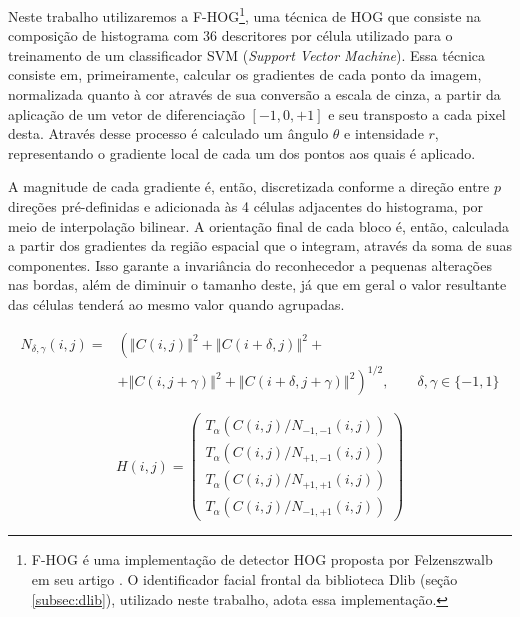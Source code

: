 Neste trabalho utilizaremos a F-HOG\footnote{F-HOG é uma implementação de detector HOG proposta por Felzenszwalb em seu artigo \cite{felzenszwalbObjectDetectionDiscriminatively}. O identificador facial frontal da biblioteca Dlib (seção \ref{subsec:dlib}), utilizado neste trabalho, adota essa implementação.}, uma técnica de HOG que consiste na composição de histograma com 36 descritores por célula utilizado para o treinamento de um classificador SVM (\textit{Support Vector Machine}).
Essa técnica consiste em, primeiramente, calcular os gradientes de cada ponto da imagem, normalizada quanto à cor através de sua conversão a escala de cinza, a partir da aplicação de um vetor de diferenciação $[-1, 0, +1]$ e seu transposto a cada pixel desta.
Através desse processo é calculado um ângulo $\theta$ e intensidade $r$, representando o gradiente local de cada um dos pontos aos quais é aplicado.

A magnitude de cada gradiente é, então, discretizada conforme a direção entre $p$ direções pré-definidas e adicionada às 4 células adjacentes do histograma, por meio de interpolação bilinear.
A orientação final de cada bloco é, então, calculada a partir dos gradientes da região espacial que o integram, através da soma de suas componentes.
Isso garante a invariância do reconhecedor a pequenas alterações nas bordas, além de diminuir o tamanho deste, já que em geral o valor resultante das células tenderá ao mesmo valor quando agrupadas.

\begin{equation}\label{eq:hog_energy}
    \begin{split}
        N_{\delta,\gamma}(i,j) = & \left(
            \left\Vert C(i,j) \right\Vert ^2 +
            \left\Vert C(i+\delta,j) \right\Vert ^2 +
            \right.\\ 
            & + \left. \left\Vert C(i,j+\gamma) \right\Vert ^2 +
            \left\Vert C(i+\delta,j+\gamma) \right\Vert ^2
            \right)^{1/2}, \qquad \delta,\gamma \in \{-1, 1\}
    \end{split}
\end{equation}

\begin{equation}\label{eq:hog_norm}
    H(i,j) = \left(\begin{matrix}
        T_\alpha(C(i,j)/N_{-1,-1}(i, j))\\
        T_\alpha(C(i,j)/N_{+1,-1}(i, j))\\
        T_\alpha(C(i,j)/N_{+1,+1}(i, j))\\
        T_\alpha(C(i,j)/N_{-1,+1}(i, j))
    \end{matrix}\right)
\end{equation}

